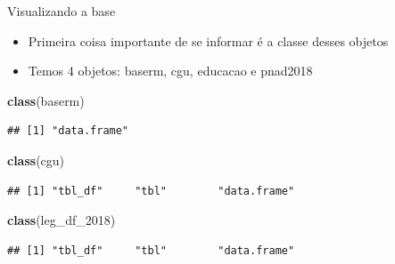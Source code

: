 \documentclass[
  10pt,
  ignorenonframetext,
]{beamer}
\newenvironment{Shaded}{\begin{snugshade}}{\end{snugshade}}
\newcommand{\DecValTok}[1]{\textcolor[rgb]{0.00,0.00,0.81}{#1}}
\newcommand{\KeywordTok}[1]{\textcolor[rgb]{0.13,0.29,0.53}{\textbf{#1}}}
\newcommand{\NormalTok}[1]{#1}
\providecommand{\tightlist}{%
  \setlength{\itemsep}{0pt}\setlength{\parskip}{0pt}}
\begin{document}
\begin{frame}[fragile]{Visualizando a base}
\protect\hypertarget{visualizando-a-base}{}
\begin{itemize}
\tightlist
\item
  Primeira coisa importante de se informar é a classe desses objetos
\item
  Temos 4 objetos: baserm, cgu, educacao e pnad2018
\end{itemize}

\begin{Shaded}
\begin{Highlighting}[]
\KeywordTok{class}\NormalTok{(baserm)}
\end{Highlighting}
\end{Shaded}

\begin{verbatim}
## [1] "data.frame"
\end{verbatim}

\begin{Shaded}
\begin{Highlighting}[]
\KeywordTok{class}\NormalTok{(cgu)}
\end{Highlighting}
\end{Shaded}

\begin{verbatim}
## [1] "tbl_df"     "tbl"        "data.frame"
\end{verbatim}

\begin{Shaded}
\begin{Highlighting}[]
\KeywordTok{class}\NormalTok{(leg\_df\_}\DecValTok{2018}\NormalTok{)}
\end{Highlighting}
\end{Shaded}

\begin{verbatim}
## [1] "tbl_df"     "tbl"        "data.frame"
\end{verbatim}
\end{frame}
\end{document}
